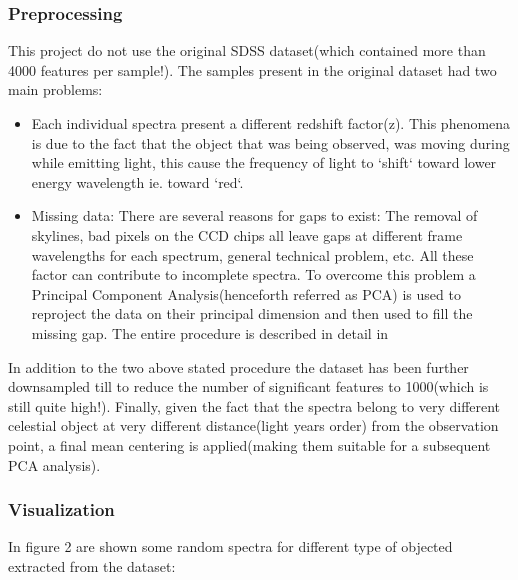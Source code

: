 \documentclass[a4paper,10pt]{article}
\begin{document}
  \subsubsection{Preprocessing}
    This project do not use the original SDSS dataset(which contained more than 4000 features per sample!).\newline
    The samples present in the original dataset had two main problems:
    \begin{itemize}
     \item Each individual spectra present a different redshift factor(z). This phenomena is due to the fact that 
	the object that was being observed, was moving during while emitting light, this cause the frequency of light
	to `shift` toward lower energy wavelength ie. toward `red`.
     
     \item Missing data: There are several reasons for gaps to exist: The removal of skylines,
	bad pixels on the CCD chips all leave gaps at different frame wavelengths for each spectrum, general technical problem, etc. 
	All these factor can contribute to incomplete spectra.\newline
	To overcome this problem a Principal Component Analysis(henceforth referred as PCA) is used to reproject the data
	on their principal dimension and then used to fill the missing gap. The entire procedure is described in detail in \cite{redshift}
    \end{itemize}
    In addition to the two above stated procedure the dataset has been further downsampled till to reduce the number of significant features
    to 1000(which is still quite high!).\newline
    Finally, given the fact that the spectra belong to very different celestial object at very different distance(light years order) from 
    the observation point, a final mean centering is applied(making them suitable for a subsequent PCA analysis).
  
  \subsubsection{Visualization}
    In figure 2 are shown some random spectra for different type of objected extracted from the dataset:
    
\end{document}
